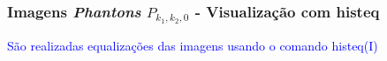 

\subsubsection{Imagens  {\it Phantons} $P_{k_1,k_2,0}$ - Visualização com histeq} 


\textcolor{blue}{São realizadas equalizações das imagens usando o comando histeq(I)}

